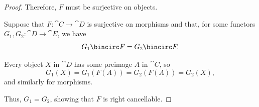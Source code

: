 \begin{proof}
  Therefore, \( F \) must be surjective on objects.

  \NecessitySubProof* Suppose that \( F: \cat{C} \to \cat{D} \) is surjective on morphisms and that, for some functors \( G_1, G_2: \cat{D} \to \cat{E} \), we have
  \begin{equation*}
    G_1 \bincirc F = G_2 \bincirc F.
  \end{equation*}

  Every object \( X \) in \( \cat{D} \) has some preimage \( A \) in \( \cat{C} \), so
  \begin{equation*}
    G_1(X) = G_1(F(A)) = G_2(F(A)) = G_2(X),
  \end{equation*}
  and similarly for morphisms.

  Thus, \( G_1 = G_2 \), showing that \( F \) is right cancellable.
\end{proof}

